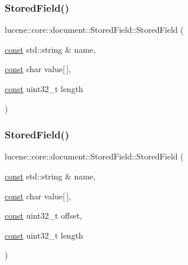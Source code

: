 \mbox{\label{classlucene_1_1core_1_1document_1_1StoredField_a774eb073a787738a115ddf94a38422e1}} 
\subsubsection{\texorpdfstring{Stored\+Field()}{StoredField()}\hspace{0.1cm}{\footnotesize\ttfamily [4/15]}}
{\footnotesize\ttfamily lucene\+::core\+::document\+::\+Stored\+Field\+::\+Stored\+Field (\begin{DoxyParamCaption}\item[{\mbox{\hyperlink{ZlibCrc32_8h_a2c212835823e3c54a8ab6d95c652660e}{const}} std\+::string \&}]{name,  }\item[{\mbox{\hyperlink{ZlibCrc32_8h_a2c212835823e3c54a8ab6d95c652660e}{const}} char}]{value\mbox{[}$\,$\mbox{]},  }\item[{\mbox{\hyperlink{ZlibCrc32_8h_a2c212835823e3c54a8ab6d95c652660e}{const}} uint32\+\_\+t}]{length }\end{DoxyParamCaption})\hspace{0.3cm}{\ttfamily [inline]}}

\mbox{\label{classlucene_1_1core_1_1document_1_1StoredField_ae9dd4a50774ddce60299b028fbcab5a9}} 
\subsubsection{\texorpdfstring{Stored\+Field()}{StoredField()}\hspace{0.1cm}{\footnotesize\ttfamily [5/15]}}
{\footnotesize\ttfamily lucene\+::core\+::document\+::\+Stored\+Field\+::\+Stored\+Field (\begin{DoxyParamCaption}\item[{\mbox{\hyperlink{ZlibCrc32_8h_a2c212835823e3c54a8ab6d95c652660e}{const}} std\+::string \&}]{name,  }\item[{\mbox{\hyperlink{ZlibCrc32_8h_a2c212835823e3c54a8ab6d95c652660e}{const}} char}]{value\mbox{[}$\,$\mbox{]},  }\item[{\mbox{\hyperlink{ZlibCrc32_8h_a2c212835823e3c54a8ab6d95c652660e}{const}} uint32\+\_\+t}]{offset,  }\item[{\mbox{\hyperlink{ZlibCrc32_8h_a2c212835823e3c54a8ab6d95c652660e}{const}} uint32\+\_\+t}]{length }\end{DoxyParamCaption})\hspace{0.3cm}{\ttfamily [inline]}}

